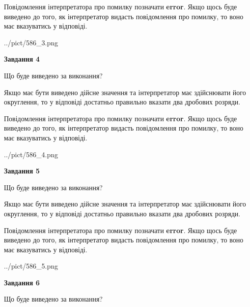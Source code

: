 \documentclass[12pt, ukrainian]{article}
\begin{document}
{\begin {Large}
Повідомлення інтерпретатора про помилку позначати \textbf{error}.
Якщо щось буде виведено до того, як інтерпретатор видасть повідомлення про помилку, 
то воно має вказуватись у відповіді. \par

\begin{center}
	{../pict/586_3.png}
\end{center}
\newpage

{\begin {center}\textbf{Завдання 4}\end {center}}\par
Що буде виведено за виконання? \par

Якщо має бути виведено дійсне значення та інтерпретатор має здійснювати його округлення, 
то у відповіді достатньо правильно вказати два дробових розряди.

Повідомлення інтерпретатора про помилку позначати \textbf{error}.
Якщо щось буде виведено до того, як інтерпретатор видасть повідомлення про помилку, 
то воно має вказуватись у відповіді. \par

\begin{center}
	{../pict/586_4.png}
\end{center}
\newpage

{\begin {center}\textbf{Завдання 5}\end {center}}\par
Що буде виведено за виконання? \par

Якщо має бути виведено дійсне значення та інтерпретатор має здійснювати його округлення, 
то у відповіді достатньо правильно вказати два дробових розряди.

Повідомлення інтерпретатора про помилку позначати \textbf{error}.
Якщо щось буде виведено до того, як інтерпретатор видасть повідомлення про помилку, 
то воно має вказуватись у відповіді. \par

\begin{center}
	{../pict/586_5.png}
\end{center}
\newpage

{\begin {center}\textbf{Завдання 6}\end {center}}\par
Що буде виведено за виконання? \par


\end{Large}}
\end{document}
